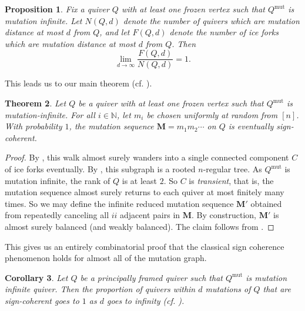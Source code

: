 \documentclass[12pt]{amsart}
\newtheorem{thm}{Theorem}[section]
\newtheorem{cor}[thm]{Corollary}
\newtheorem{prop}[thm]{Proposition}
\theoremstyle{definition}
\theoremstyle{remark}
\numberwithin{equation}{section}
\newcommand{\N} { \mathbb{N}}
\newcommand{\mut} {\text{mut}}
\begin{document}
\begin{prop}
\label{prop: ice forks are all the class}
Fix a quiver $Q$ with at least one frozen vertex such that $Q^{\mut}$ is mutation infinite.
Let $N(Q,d)$ denote the number of quivers which are mutation distance at most $d$ from $Q$, and let $F(Q,d)$ denote the number of ice forks which are mutation distance at most $d$ from $Q$.
Then 
$$\lim_{d \rightarrow \infty} \frac{F(Q,d)}{N(Q,d)} = 1.$$
\end{prop}



This leads us to our main theorem (cf. ).




\begin{thm}\label{thm: geq 3 eventually sc}
Let $Q$ be a quiver with at least one frozen vertex such that $Q^{\mut}$ is mutation-infinite.  For all $i \in \N$, let $m_i$ be chosen uniformly at random from $[n]$.  With probability $1$, the mutation sequence $\mathbf M = m_1m_2\cdots$ on $Q$ is eventually sign-coherent. 
\end{thm}

\begin{proof}
By , this walk almost surely wanders into a single connected component $C$ of ice forks eventually. 
By , this subgraph is a rooted $n$-regular tree.
As $Q^{\mut}$ is mutation infinite, the rank of $Q$ is at least $2$.
So $C$ is \emph{transient}, that is, the mutation sequence almost surely returns to each quiver at most finitely many times. 
So we may define the infinite reduced mutation sequence $\mathbf M'$  obtained from repeatedly canceling all $ii$ adjacent pairs in $\mathbf M$.
By construction, $\mathbf M'$ is almost surely balanced (and weakly balanced). The claim follows from .
\end{proof}

This gives us an entirely combinatorial proof that the classical sign coherence phenomenon holds for almost all of the mutation graph.

\begin{cor}
\label{cor:principal framing result}
Let $Q$ be a principally framed quiver such that $Q^{\mut}$ is mutation infinite quiver. 
Then the proportion of quivers within $d$ mutations of $Q$ that are sign-coherent goes to $1$ as $d$ goes to infinity (cf. ). 
\end{cor}
\end{document}
